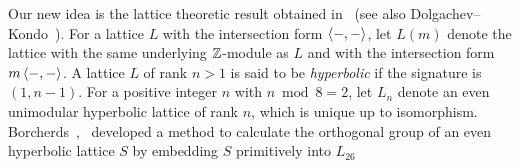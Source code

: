 \documentclass{amsart}
\numberwithin{procedure}{section}
\begin{document}
%
%
%
%
%
Our new idea is the lattice theoretic result
obtained in~\cite{BS2019}
(see also Dolgachev--Kondo~\cite[Chapter~10]{DKbook}).
For a lattice $L$ with the intersection form $\langle -,- \rangle$,
let $L(m)$ denote the lattice with
the same underlying $\mathord{\mathbb Z}$-module as $L$ and
with the intersection form $m\,\langle -,- \rangle$.
A lattice $L$ of rank $n>1$ is said to be \emph{hyperbolic}   if the signature is $(1, n-1)$.
For a positive integer $n$ with $n\bmod 8=2$,
let $L_n$ denote an even unimodular hyperbolic lattice  of rank $n$,
which is unique up to isomorphism.
Borcherds~\cite{Bor1},~\cite{Bor2} developed a method
to calculate the orthogonal group of an even  hyperbolic lattice $S$
by embedding $S$ primitively into $L_{26}$
\end{document}
